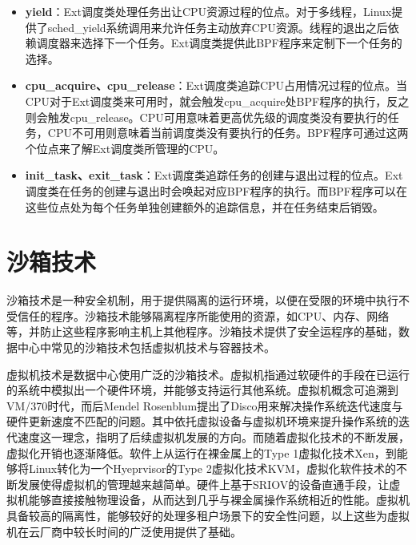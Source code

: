 \begin{itemize}
    \item \textbf{yield}：Ext调度类处理任务出让CPU资源过程的位点。对于多线程，Linux提供了sched\_yield系统调用来允许任务主动放弃CPU资源。线程的退出之后依赖调度器来选择下一个任务。Ext调度类提供此BPF程序来定制下一个任务的选择。

    \item \textbf{cpu\_acquire、cpu\_release}：Ext调度类追踪CPU占用情况过程的位点。当CPU对于Ext调度类来可用时，就会触发cpu\_acquire处BPF程序的执行，反之则会触发cpu\_release。CPU可用意味着更高优先级的调度类没有要执行的任务，CPU不可用则意味着当前调度类没有要执行的任务。BPF程序可通过这两个位点来了解Ext调度类所管理的CPU。

    \item \textbf{init\_task、exit\_task}：Ext调度类追踪任务的创建与退出过程的位点。Ext调度类在任务的创建与退出时会唤起对应BPF程序的执行。而BPF程序可以在这些位点处为每个任务单独创建额外的追踪信息，并在任务结束后销毁。

\end{itemize}

\section{沙箱技术}


沙箱技术是一种安全机制，用于提供隔离的运行环境，以便在受限的环境中执行不受信任的程序。沙箱技术能够隔离程序所能使用的资源，如CPU、内存、网络等，并防止这些程序影响主机上其他程序。沙箱技术提供了安全运程序的基础，数据中心中常见的沙箱技术包括虚拟机技术与容器技术。

虚拟机技术是数据中心使用广泛的沙箱技术。虚拟机指通过软硬件的手段在已运行的系统中模拟出一个硬件环境，并能够支持运行其他系统。虚拟机概念可追溯到VM/370\citep{creasy1981origin}时代，而后Mendel Rosenblum提出了Disco\citep{bugnion1997disco}用来解决操作系统迭代速度与硬件更新速度不匹配的问题。其中依托虚拟设备与虚拟机环境来提升操作系统的迭代速度这一理念，指明了后续虚拟机发展的方向。而随着虚拟化技术的不断发展，虚拟化开销也逐渐降低。软件上从运行在裸金属上的Type 1虚拟化技术Xen\citep{barham2003xen}，到能够将Linux转化为一个Hyeprvisor的Type 2虚拟化技术KVM\citep{kivity2007kvm}，虚拟化软件技术的不断发展使得虚拟机的管理越来越简单。硬件上基于SRIOV的设备直通手段\citep{dong2012high}，让虚拟机能够直接接触物理设备，从而达到几乎与裸金属操作系统相近的性能。虚拟机具备较高的隔离性，能够较好的处理多租户场景下的安全性问题，以上这些为虚拟机在云厂商中较长时间的广泛使用提供了基础。

